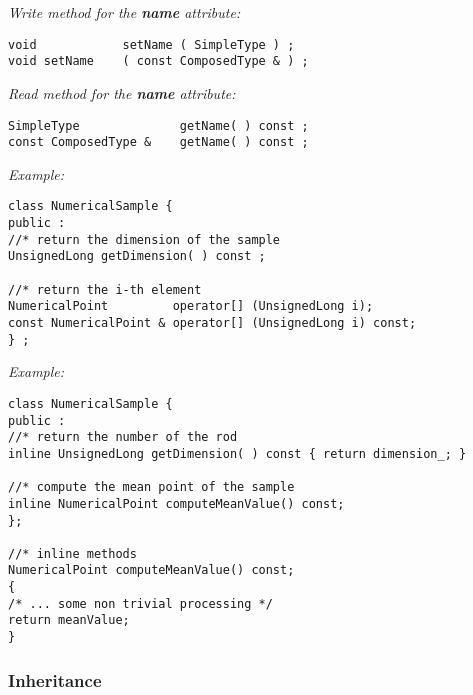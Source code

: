 \emph{Write method for the {\bf name} attribute:}
\lstset{language=C++, basicstyle=\normalsize}
\begin{lstlisting}[frame=TBRL]
void            setName ( SimpleType ) ;
void setName    ( const ComposedType & ) ;
\end{lstlisting}
\emph{Read method for the {\bf name} attribute:}
\lstset{language=C++, basicstyle=\normalsize}
\begin{lstlisting}[frame=TBRL]
SimpleType              getName( ) const ;
const ComposedType &    getName( ) const ;
\end{lstlisting}
\emph{Example:}
\lstset{language=C++, basicstyle=\normalsize}
\begin{lstlisting}[frame=TBRL]
class NumericalSample {
public :
//* return the dimension of the sample
UnsignedLong getDimension( ) const ;

//* return the i-th element
NumericalPoint         operator[] (UnsignedLong i);
const NumericalPoint & operator[] (UnsignedLong i) const;
} ;
\end{lstlisting}


\emph{Example:}
\lstset{language=C++, basicstyle=\normalsize}
\begin{lstlisting}[frame=TBRL]
class NumericalSample {
public :
//* return the number of the rod
inline UnsignedLong getDimension( ) const { return dimension_; }

//* compute the mean point of the sample
inline NumericalPoint computeMeanValue() const;
};

//* inline methods
NumericalPoint computeMeanValue() const;
{
/* ... some non trivial processing */
return meanValue;
}
\end{lstlisting}


\subsubsection{Inheritance}


